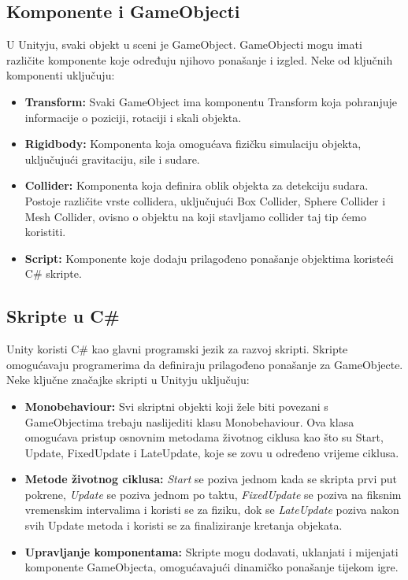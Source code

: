 \documentclass[diplomskirad]{fer}
\begin{document}
    \subsection{Komponente i GameObjecti}\label{subsec:komponente-i-gameobjecti}
    U Unityju, svaki objekt u sceni je GameObject.
    GameObjecti mogu imati različite komponente koje određuju njihovo ponašanje i izgled.
    Neke od ključnih komponenti uključuju:
    \begin{itemize}
        \item \textbf{Transform:} Svaki GameObject ima komponentu Transform koja pohranjuje informacije o poziciji, rotaciji i skali objekta.
        \item \textbf{Rigidbody:} Komponenta koja omogućava fizičku simulaciju objekta, uključujući gravitaciju, sile i sudare.
        \item \textbf{Collider:} Komponenta koja definira oblik objekta za detekciju sudara.
        Postoje različite vrste collidera, uključujući Box Collider, Sphere Collider i Mesh Collider, ovisno o objektu na koji stavljamo collider taj tip ćemo koristiti.
        \item \textbf{Script:} Komponente koje dodaju prilagođeno ponašanje objektima koristeći C\# skripte.
    \end{itemize}

    \subsection{Skripte u C\#}\label{subsec:skripte-u-c}
    Unity koristi C\# kao glavni programski jezik za razvoj skripti.
    Skripte omogućavaju programerima da definiraju prilagođeno ponašanje za GameObjecte.
    Neke ključne značajke skripti u Unityju uključuju:
    \begin{itemize}
        \item \textbf{Monobehaviour:} Svi skriptni objekti koji žele biti povezani s GameObjectima trebaju naslijediti klasu Monobehaviour.
        Ova klasa omogućava pristup osnovnim metodama životnog ciklusa kao što su Start, Update, FixedUpdate i LateUpdate, koje se zovu u određeno vrijeme ciklusa.
        \item \textbf{Metode životnog ciklusa:} \textit{Start} se poziva jednom kada se skripta prvi put pokrene, \textit{Update} se poziva jednom po taktu, \textit{FixedUpdate} se poziva na fiksnim vremenskim intervalima i koristi se za fiziku, dok se \textit{LateUpdate} poziva nakon svih Update metoda i koristi se za finaliziranje kretanja objekata.
        \item \textbf{Upravljanje komponentama:} Skripte mogu dodavati, uklanjati i mijenjati komponente GameObjecta, omogućavajući dinamičko ponašanje tijekom igre.
    \end{itemize}
\end{document}
